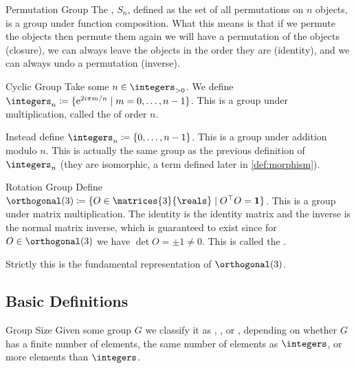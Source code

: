\documentclass[fleqn]{NotesClass}
\newcommand*{\trans}{\top}
\newcommand*{\positiveintegers}{\integers_{>0}}
\newcommand*{\ident}{\mathbf{1}}
\newcommand*{\e}{\mathrm{e}}
\begin{document}
    \begin{exm}{Permutation Group}{}
        The , \(S_n\), defined as the set of all permutations on \(n\) objects, is a group under function composition.
        What this means is that if we permute the objects then permute them again we will have a permutation of the objects (closure), we can always leave the objects in the order they are (identity), and we can always undo a permutation (inverse).
    \end{exm}
    
    \begin{exm}{Cyclic Group}{}
        Take some \(n \in \positiveintegers\).
        We define \(\integers_n \coloneqq \{\e^{2i\pi m/n} \mid m = 0, \dotsc, n - 1\}\).
        This is a group under multiplication, called the  of order \(n\).
        
        Instead define \(\integers_n \coloneqq \{0, \dotsc, n - 1\}\).
        This is a group under addition modulo \(n\).
        This is actually the same group as the previous definition of \(\integers_n\) (they are isomorphic, a term defined later in \cref{def:morphism}).
    \end{exm}
    
    \begin{exm}{Rotation Group}{}
        Define \(\orthogonal(3) \coloneqq \{ O \in \matrices{3}{\reals} \mid  O^\trans O = \ident\}\).
        This is a group under matrix multiplication.
        The identity is the identity matrix and the inverse is the normal matrix inverse, which is guaranteed to exist since for \(O \in \orthogonal(3)\) we have \(\det O = \pm 1 \ne 0\).
        This is called the .
        
        \begin{rmk}
            Strictly this is the fundamental representation of \(\orthogonal(3)\).
        \end{rmk}
    \end{exm}
    
    \subsection{Basic Definitions}
    \begin{dfn}{Group Size}{}
        Given some group \(G\) we classify it as , , or , depending on whether \(G\) has a finite number of elements, the same number of elements as \(\integers\), or more elements than \(\integers\).
    \end{dfn}
    
\end{document}

